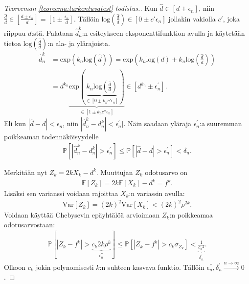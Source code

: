 \documentclass[finnish,12pt,a4paper,pdftex,sci,utf8]{aaltothesis}
\begin{document}
\begin{proof}[Teoreeman \ref{teoreema:tarkentuvatest} todistus.]
	Kun $\hat{d} \in [d \pm \epsilon_{n}^{}]$, niin $\frac{\hat{d}}{d} \in [\frac{d \pm \epsilon_{n}^{}}{d}] = [1 \pm \frac{\epsilon_{n}^{}}{d}]$. Tällöin $\text{log}(\frac{\hat{d}}{d}) \in [0 \pm c'\epsilon_{n}^{}]$ jollakin vakiolla $c'$, joka riippuu $d$:stä.
	Palataan $\hat{d}^k_n$:n esiteykseen eksponenttifunktion avulla ja käytetään tietoa $\text{log}(\frac{\hat{d}}{d})$:n ala- ja ylärajoista.
	\begin{align*}
		\hat{d}^k_n &= \text{exp}(k_n \text{log}(\hat{d})) = \text{exp}(k_n\text{log}(d) + k_n \text{log}(\frac{\hat{d}}{d})) \\
		&= d^{k_n} \underbrace{\text{exp}(\underbrace{k_n \text{log}(\frac{\hat{d}}{d})}_{\in [0 \pm k_n c' \epsilon_{n}^{}]})}_{\in [1 \pm k_n c'' \epsilon_{n}^{}]} \in [d^{k_n} \pm \epsilon_{n}^{'}].
	\end{align*}
	Eli  kun $|\hat{d} - d| < \epsilon_{n}^{}$, niin $|\hat{d}^k_n - d^k_n| < \epsilon_{n}^{'}|$. Näin saadaan yläraja $\epsilon_{n}^{'}$:a suuremman poikkeaman todennäköisyydelle 
	\begin{align*}
		\mathbb{P}[|\hat{d}^k_n - d^k_n| > \epsilon_{n}^{'}] \leq \mathbb{P}[|\hat{d} - d| > \epsilon_{n}^{'}] < \delta_n.
	\end{align*}

	Merkitään nyt $Z_k = 2k X_k - d^k$. Muuttujan $Z_k$ odotusarvo on 
	\begin{align*}
		\mathbb{E}[Z_k] = 2k \mathbb{E}[X_k] - d^k = f^k.
	\end{align*}
	Lisäksi sen varianssi voidaan rajoittaa $X_k$:n variassin avulla: 
	\begin{align*}
		\text{Var}[Z_k] = (2k)^2\text{Var}[X_k] < (2k)^2 \rho^{2k}.
	\end{align*}
	Voidaan käyttää Chebysevin epäyhtälöä arvioimaan $Z_k$:n poikkeamaa odotusarvostaan:
	\begin{align*}
		\mathbb{P}[|Z_k - f^k| > \underbrace{c_k 2k \rho^k}_{\epsilon_{n}^{''}}] \leq \mathbb{P}[|Z_k - f^k| > c_k \sigma_{Z_k}] < \underbrace{\frac{1}{{c_k}^2}}_{\delta_n^{'}}.
	\end{align*}
	Olkoon $c_k$ jokin polynomisesti $k$:n suhteen kasvava funktio. Tällöin $\epsilon_{n}^{''}, \delta_n^{'} \xrightarrow{ n \rightarrow \infty} 0$.


\end{proof}
\end{document}
